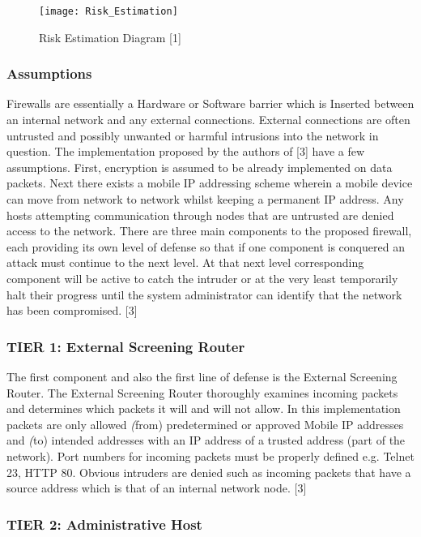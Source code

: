 \documentclass[11pt,onecolumn,cspaper,compsoc]{IEEEtran}
\begin{document}
\begin{figure}[!h]
  \centering
  \texttt{[image: Risk\_Estimation]}
  \caption{Risk Estimation Diagram [1]}
  \label{RE}
\end{figure}

\subsubsection*{Assumptions}

Firewalls are essentially a Hardware or Software barrier which is Inserted between an internal network and any external connections. External 
connections are often untrusted and possibly unwanted or harmful intrusions into the network in question. The implementation proposed by the 
authors of [3] have a few assumptions. First, encryption is assumed to be already implemented on data packets. Next there exists a mobile IP 
addressing scheme wherein a mobile device can move from network to network whilst keeping a permanent IP address. 
Any hosts attempting communication through nodes that are untrusted are denied access to the network. There are three main components to the 
proposed firewall, each providing its own level of defense so that if one component is conquered an attack must continue to the next level. 
At that next level corresponding component will be active to catch the intruder or at the very least temporarily halt their progress until 
the system administrator can identify that the network has been compromised. [3] 

\subsubsection*{TIER 1: External Screening Router}

The first component and also the first line of defense is the External Screening Router. The External Screening Router thoroughly examines 
incoming packets and determines which packets it will and will not allow. In this implementation packets are only allowed \textit(from) 
predetermined or approved Mobile IP addresses and \textit(to) intended addresses with an IP address of a trusted address 
(part of the network). Port numbers for incoming packets must be properly defined e.g. Telnet 23, HTTP 80. Obvious intruders are denied such 
as incoming packets that have a source address which is that of an internal network node. [3]

\subsubsection*{TIER 2: Administrative Host}
\end{document}
